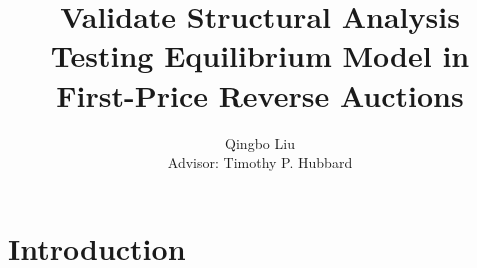 \documentclass[11pt]{article}
\title{%
    Validate Structural Analysis \\ 
    \large Testing Equilibrium Model in First-Price Reverse Auctions}
\author{Qingbo Liu\\[0.5cm]{\small Advisor: Timothy P. Hubbard}}
\begin{document}
\maketitle

\section{Introduction}


\end{document}
